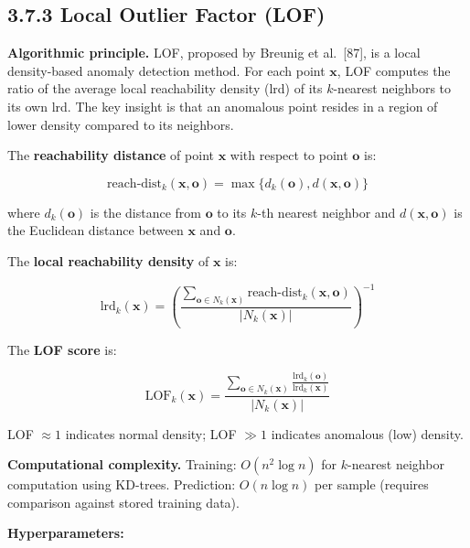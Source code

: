 \documentclass[
  a4paper]{report}
\begin{document}
\subsection{3.7.3 Local Outlier Factor
(LOF)}\label{local-outlier-factor-lof-1}

\textbf{Algorithmic principle.} LOF, proposed by Breunig et
al.~{[}87{]}, is a local density-based anomaly detection method. For
each point \(\mathbf{x}\), LOF computes the ratio of the average local
reachability density (lrd) of its \(k\)-nearest neighbors to its own
lrd. The key insight is that an anomalous point resides in a region of
lower density compared to its neighbors.

The \textbf{reachability distance} of point \(\mathbf{x}\) with respect
to point \(\mathbf{o}\) is:

\[\text{reach-dist}_k(\mathbf{x}, \mathbf{o}) = \max\{d_k(\mathbf{o}), d(\mathbf{x}, \mathbf{o})\}\]

where \(d_k(\mathbf{o})\) is the distance from \(\mathbf{o}\) to its
\(k\)-th nearest neighbor and \(d(\mathbf{x}, \mathbf{o})\) is the
Euclidean distance between \(\mathbf{x}\) and \(\mathbf{o}\).

The \textbf{local reachability density} of \(\mathbf{x}\) is:

\[\text{lrd}_k(\mathbf{x}) = \left(\frac{\sum_{\mathbf{o} \in N_k(\mathbf{x})} \text{reach-dist}_k(\mathbf{x}, \mathbf{o})}{|N_k(\mathbf{x})|}\right)^{-1}\]

The \textbf{LOF score} is:

\[\text{LOF}_k(\mathbf{x}) = \frac{\sum_{\mathbf{o} \in N_k(\mathbf{x})} \frac{\text{lrd}_k(\mathbf{o})}{\text{lrd}_k(\mathbf{x})}}{|N_k(\mathbf{x})|}\]

LOF \(\approx 1\) indicates normal density; LOF \(\gg 1\) indicates
anomalous (low) density.

\textbf{Computational complexity.} Training: \(O(n^2 \log n)\) for
\(k\)-nearest neighbor computation using KD-trees. Prediction:
\(O(n \log n)\) per sample (requires comparison against stored training
data).

\textbf{Hyperparameters:}
\end{document}
